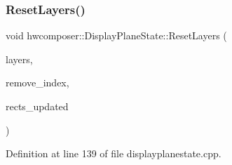 \subsubsection{\texorpdfstring{Reset\+Layers()}{ResetLayers()}}
{\footnotesize\ttfamily void hwcomposer\+::\+Display\+Plane\+State\+::\+Reset\+Layers (\begin{DoxyParamCaption}\item[{const std\+::vector$<$ \mbox{\hyperlink{structhwcomposer_1_1OverlayLayer}{Overlay\+Layer}} $>$ \&}]{layers,  }\item[{size\+\_\+t}]{remove\+\_\+index,  }\item[{bool $\ast$}]{rects\+\_\+updated }\end{DoxyParamCaption})}



Definition at line 139 of file displayplanestate.\+cpp.


